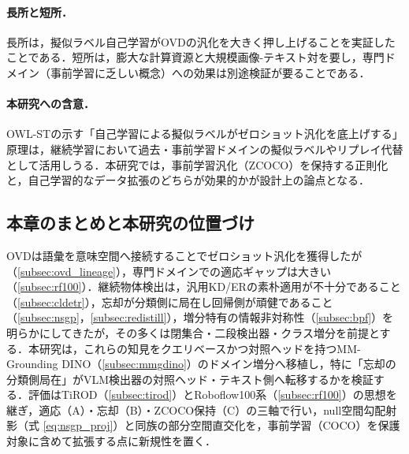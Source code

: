 \paragraph{長所と短所．}
長所は，擬似ラベル自己学習がOVDの汎化を大きく押し上げることを実証したことである．短所は，膨大な計算資源と大規模画像-テキスト対を要し，専門ドメイン（事前学習に乏しい概念）への効果は別途検証が要ることである．

\paragraph{本研究への含意．}
OWL-STの示す「自己学習による擬似ラベルがゼロショット汎化を底上げする」原理は，継続学習において過去・事前学習ドメインの擬似ラベルやリプレイ代替として活用しうる．本研究では，事前学習汎化（ZCOCO）を保持する正則化と，自己学習的なデータ拡張のどちらが効果的かが設計上の論点となる．


\subsection{本章のまとめと本研究の位置づけ}
\label{subsec:detovd_summary}

OVDは語彙を意味空間へ接続することでゼロショット汎化を獲得したが（\ref{subsec:ovd_lineage}），専門ドメインでの適応ギャップは大きい（\ref{subsec:rf100}）．継続物体検出は，汎用KD/ERの素朴適用が不十分であること（\ref{subsec:cldetr}），忘却が分類側に局在し回帰側が頑健であること（\ref{subsec:nsgp}，\ref{subsec:redistill}），増分特有の情報非対称性（\ref{subsec:bpf}）を明らかにしてきたが，その多くは閉集合・二段検出器・クラス増分を前提とする．本研究は，これらの知見をクエリベースかつ対照ヘッドを持つMM-Grounding DINO（\ref{subsec:mmgdino}）のドメイン増分へ移植し，特に「忘却の分類側局在」がVLM検出器の対照ヘッド・テキスト側へ転移するかを検証する．評価はTiROD（\ref{subsec:tirod}）とRoboflow100系（\ref{subsec:rf100}）の思想を継ぎ，適応（A）・忘却（B）・ZCOCO保持（C）の三軸で行い，null空間勾配射影（式 \eqref{eq:nsgp_proj}）と同族の部分空間直交化を，事前学習（COCO）を保護対象に含めて拡張する点に新規性を置く．


